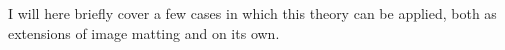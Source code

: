 I will here briefly cover a few cases in which this theory can be applied, both as extensions of image matting and on its own.